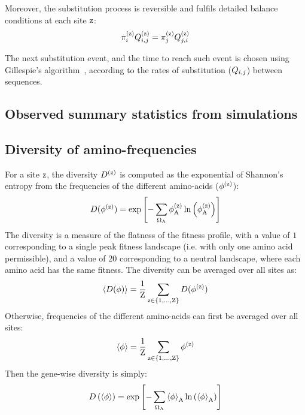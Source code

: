 Moreover, the substitution process is reversible and fulfils detailed balance conditions at each site $\text{z}$:
\begin{align}
    \pi_{{i}}^{(\text{z})} Q_{{i}, {j}}^{(\text{z})} = \pi_{{j}}^{(\text{z})} Q_{{j}, {i}}^{(\text{z})}
    \label{codonSubBalance}
\end{align}

The next substitution event, and the time to reach such event is chosen using Gillespie's algorithm~\citep{Gillespie1977}, according to the rates of substitution ($Q_{{i}, {j}}$) between sequences.

\subsection{Observed summary statistics from simulations}
\label{subsec:summary-statistics}

\subsection{Diversity of amino-frequencies}
\label{subsec:entropy}

For a site $\text{z}$, the diversity $D^{(\text{z})}$ is computed as the exponential of Shannon's entropy from the frequencies of the different amino-acids ($\phi^{(\text{z})}$):
\begin{equation}
    D(\phi^{(\text{z})}) = \exp \left[ - \sum\limits_{\Omega_{\text{A}}} \phi^{(\text{z})}_{\text{A}} \ln \left( \phi^{(\text{z})}_{\text{A}} \right) \right]
    \label{eq:diversity-site-specific}
\end{equation}
The diversity is a measure of the flatness of the fitness profile, with a value of $1$ corresponding to a single peak fitness landscape (i.e. with only one amino acid permissible), and a value of $20$ corresponding to a neutral landscape, where each amino acid has the same fitness.
The diversity can be averaged over all sites as:
\begin{equation}
    \left\langle D(\phi) \right\rangle = \dfrac{1}{\text{Z}}\sum\limits_{\text{z} \in \{1, \hdots, \text{Z}\}} D(\phi^{(\text{z})})
    \label{eq:diversity-site-specific-avg}
\end{equation}
Otherwise, frequencies of the different amino-acids can first be averaged over all sites:
\begin{equation}
    \left\langle \phi \right\rangle = \dfrac{1}{\text{Z}}\sum\limits_{\text{z} \in \{1, \hdots, \text{Z}\}} \phi^{(\text{z})}
    \label{eq:profile-gene-wise}
\end{equation}
Then the gene-wise diversity is simply:
\begin{equation}
     D \left(  \left\langle \phi \right\rangle \right) = \exp \left[ - \sum\limits_{\Omega_{\text{A}}} \left\langle \phi \right\rangle_{\text{A}} \ln \left( \left\langle \phi \right\rangle_{\text{A}} \right) \right]
     \label{eq:diversity-gene-wise}
\end{equation}

